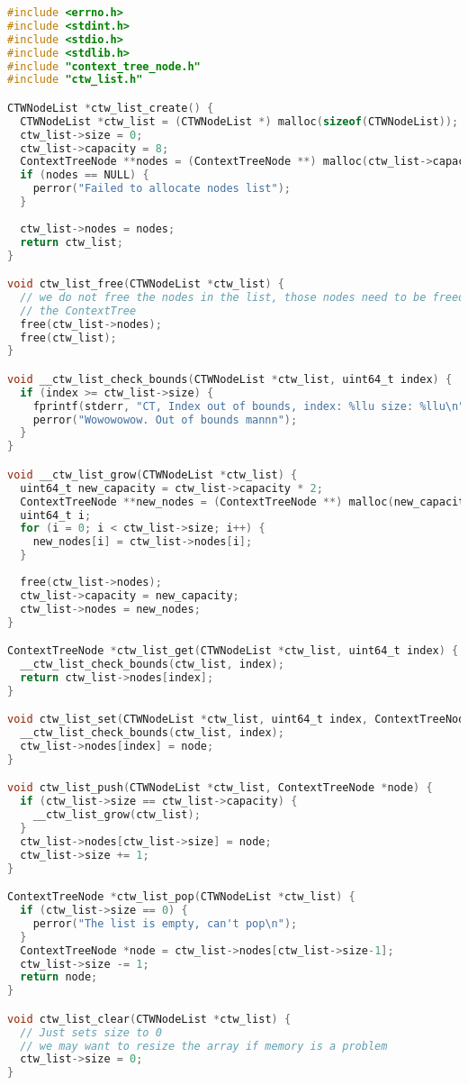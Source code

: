 \documentclass[fancychapters]{report}   	%
\begin{document}
\begin{lstlisting}[language=C,caption={ctw_list.c}]
#include <errno.h>
#include <stdint.h>
#include <stdio.h>
#include <stdlib.h>
#include "context_tree_node.h"
#include "ctw_list.h"

CTWNodeList *ctw_list_create() {
  CTWNodeList *ctw_list = (CTWNodeList *) malloc(sizeof(CTWNodeList));
  ctw_list->size = 0;
  ctw_list->capacity = 8;
  ContextTreeNode **nodes = (ContextTreeNode **) malloc(ctw_list->capacity * sizeof(ContextTreeNode *));
  if (nodes == NULL) {
    perror("Failed to allocate nodes list");
  }
  
  ctw_list->nodes = nodes;
  return ctw_list;
}

void ctw_list_free(CTWNodeList *ctw_list) {
  // we do not free the nodes in the list, those nodes need to be freed from
  // the ContextTree
  free(ctw_list->nodes);
  free(ctw_list);
}

void __ctw_list_check_bounds(CTWNodeList *ctw_list, uint64_t index) {
  if (index >= ctw_list->size) {
    fprintf(stderr, "CT, Index out of bounds, index: %llu size: %llu\n", index, ctw_list->size);
    perror("Wowowowow. Out of bounds mannn");
  }
}

void __ctw_list_grow(CTWNodeList *ctw_list) {
  uint64_t new_capacity = ctw_list->capacity * 2;
  ContextTreeNode **new_nodes = (ContextTreeNode **) malloc(new_capacity * sizeof(ContextTreeNode *));
  uint64_t i;
  for (i = 0; i < ctw_list->size; i++) {
    new_nodes[i] = ctw_list->nodes[i];
  }
  
  free(ctw_list->nodes);
  ctw_list->capacity = new_capacity;
  ctw_list->nodes = new_nodes;
}

ContextTreeNode *ctw_list_get(CTWNodeList *ctw_list, uint64_t index) {
  __ctw_list_check_bounds(ctw_list, index);
  return ctw_list->nodes[index];
}

void ctw_list_set(CTWNodeList *ctw_list, uint64_t index, ContextTreeNode *node) {
  __ctw_list_check_bounds(ctw_list, index);
  ctw_list->nodes[index] = node;
}

void ctw_list_push(CTWNodeList *ctw_list, ContextTreeNode *node) {
  if (ctw_list->size == ctw_list->capacity) {
    __ctw_list_grow(ctw_list);
  }
  ctw_list->nodes[ctw_list->size] = node;
  ctw_list->size += 1;
}

ContextTreeNode *ctw_list_pop(CTWNodeList *ctw_list) {
  if (ctw_list->size == 0) {
    perror("The list is empty, can't pop\n");
  }
  ContextTreeNode *node = ctw_list->nodes[ctw_list->size-1];
  ctw_list->size -= 1;
  return node;
}

void ctw_list_clear(CTWNodeList *ctw_list) {
  // Just sets size to 0
  // we may want to resize the array if memory is a problem
  ctw_list->size = 0;
}
\end{lstlisting}
\end{document}
